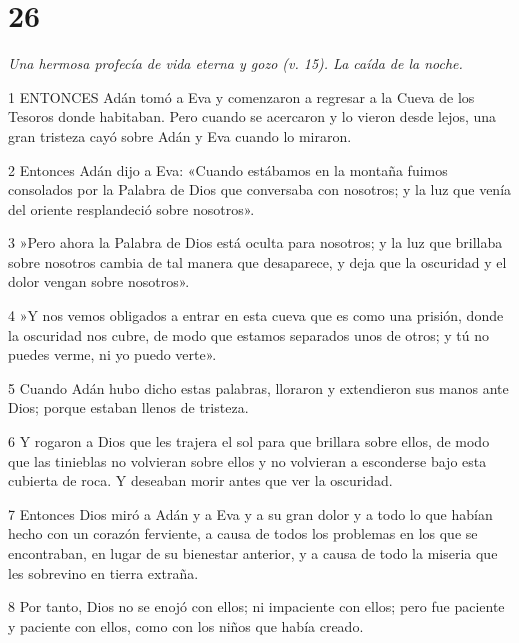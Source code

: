 \chapter{26}

\par \textit{Una hermosa profecía de vida eterna y gozo (v. 15). La caída de la noche.}

\par 1 ENTONCES Adán tomó a Eva y comenzaron a regresar a la Cueva de los Tesoros donde habitaban. Pero cuando se acercaron y lo vieron desde lejos, una gran tristeza cayó sobre Adán y Eva cuando lo miraron.

\par 2 Entonces Adán dijo a Eva: «Cuando estábamos en la montaña fuimos consolados por la Palabra de Dios que conversaba con nosotros; y la luz que venía del oriente resplandeció sobre nosotros».

\par 3 »Pero ahora la Palabra de Dios está oculta para nosotros; y la luz que brillaba sobre nosotros cambia de tal manera que desaparece, y deja que la oscuridad y el dolor vengan sobre nosotros».

\par 4 »Y nos vemos obligados a entrar en esta cueva que es como una prisión, donde la oscuridad nos cubre, de modo que estamos separados unos de otros; y tú no puedes verme, ni yo puedo verte».

\par 5 Cuando Adán hubo dicho estas palabras, lloraron y extendieron sus manos ante Dios; porque estaban llenos de tristeza.

\par 6 Y rogaron a Dios que les trajera el sol para que brillara sobre ellos, de modo que las tinieblas no volvieran sobre ellos y no volvieran a esconderse bajo esta cubierta de roca. Y deseaban morir antes que ver la oscuridad.

\par 7 Entonces Dios miró a Adán y a Eva y a su gran dolor y a todo lo que habían hecho con un corazón ferviente, a causa de todos los problemas en los que se encontraban, en lugar de su bienestar anterior, y a causa de todo la miseria que les sobrevino en tierra extraña.

\par 8 Por tanto, Dios no se enojó con ellos; ni impaciente con ellos; pero fue paciente y paciente con ellos, como con los niños que había creado.

